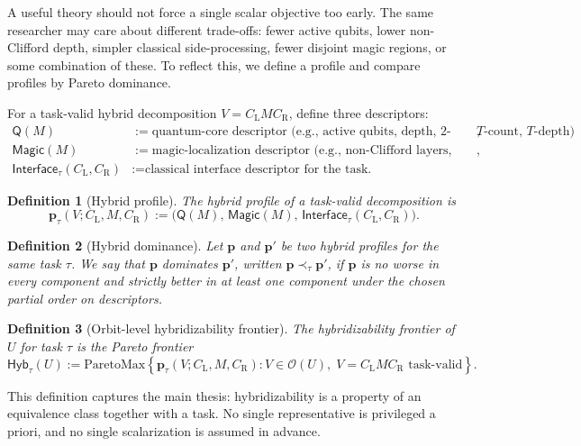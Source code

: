 \documentclass[11pt]{article}
\newtheorem{definition}{Definition}
\theoremstyle{remark}
\newcommand{\orbit}{\mathcal{O}}
\newcommand{\Hyb}{\mathsf{Hyb}}
\newcommand{\Magic}{\mathsf{Magic}}
\newcommand{\Interface}{\mathsf{Interface}}
\newcommand{\Qcore}{\mathsf{Q}}
\begin{document}
A useful theory should not force a single scalar objective too early. The same researcher may care about different trade-offs: fewer active qubits, lower non-Clifford depth, simpler classical side-processing, fewer disjoint magic regions, or some combination of these. To reflect this, we define a profile and compare profiles by Pareto dominance.

For a task-valid hybrid decomposition $V = C_{\mathrm{L}} M C_{\mathrm{R}}$, define three descriptors:
\begin{align*}
\Qcore(M) &:= \text{quantum-core descriptor (e.g., active qubits, depth, 2-qubit count, $T$-count, $T$-depth)},\\
\Magic(M) &:= \text{magic-localization descriptor (e.g., non-Clifford layers, support width, region count)},\\
\Interface_{\tau}(C_{\mathrm{L}}, C_{\mathrm{R}}) &:= \text{classical interface descriptor for the task.}
\end{align*}

\begin{definition}[Hybrid profile]
The \emph{hybrid profile} of a task-valid decomposition is
\[
\mathbf{p}_{\tau}(V; C_{\mathrm{L}}, M, C_{\mathrm{R}})
:=
\bigl(\Qcore(M),\, \Magic(M),\, \Interface_{\tau}(C_{\mathrm{L}}, C_{\mathrm{R}})\bigr).
\]
\end{definition}

\begin{definition}[Hybrid dominance]
Let $\mathbf{p}$ and $\mathbf{p}'$ be two hybrid profiles for the same task $\tau$. We say that $\mathbf{p}$ \emph{dominates} $\mathbf{p}'$, written $\mathbf{p} \prec_{\tau} \mathbf{p}'$, if $\mathbf{p}$ is no worse in every component and strictly better in at least one component under the chosen partial order on descriptors.
\end{definition}

\begin{definition}[Orbit-level hybridizability frontier]
The \emph{hybridizability frontier} of $U$ for task $\tau$ is the Pareto frontier
\[
\Hyb_{\tau}(U)
:=
\mathrm{ParetoMax}\left\{
\mathbf{p}_{\tau}(V; C_{\mathrm{L}}, M, C_{\mathrm{R}})
:
V \in \orbit(U),\; V = C_{\mathrm{L}} M C_{\mathrm{R}} \text{ task-valid}
\right\}.
\]
\end{definition}

This definition captures the main thesis: hybridizability is a property of an equivalence class together with a task. No single representative is privileged a priori, and no single scalarization is assumed in advance.
\end{document}
